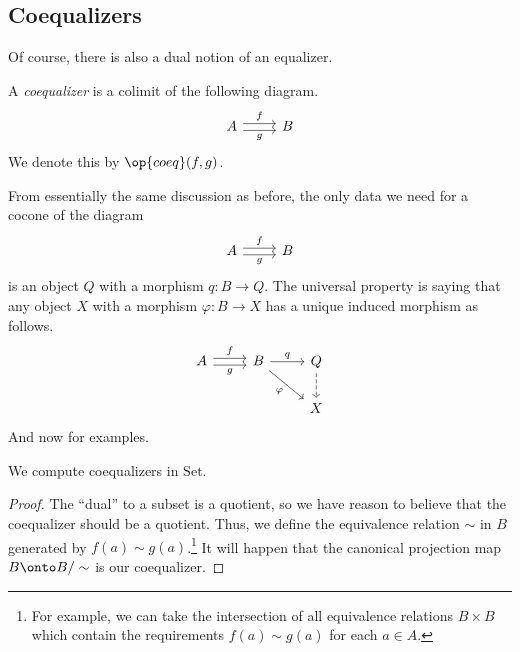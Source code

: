 \documentclass[../notes.tex]{subfiles}
\begin{document}
\subsection{Coequalizers}
Of course, there is also a dual notion of an equalizer.
\begin{defi}[Coequalizer]
	A \textit{coequalizer} is a colimit of the following diagram.
	\[\begin{tikzcd}
		A & B
		\arrow["g"', shift right=1, from=1-1, to=1-2]
		\arrow["f", shift left=1, from=1-1, to=1-2]
	\end{tikzcd}\]
	We denote this by $\op{coeq}(f,g)$.
\end{defi}
From essentially the same discussion as before, the only data we need for a cocone of the diagram
\[\begin{tikzcd}
	A & B
	\arrow["g"', shift right=1, from=1-1, to=1-2]
	\arrow["f", shift left=1, from=1-1, to=1-2]
\end{tikzcd}\]
is an object $Q$ with a morphism $q:B\to Q$. The universal property is saying that any object $X$ with a morphism $\varphi:B\to X$ has a unique induced morphism as follows.
\[\begin{tikzcd}
	A & B & Q \\
	&& X
	\arrow["g"', shift right=1, from=1-1, to=1-2]
	\arrow["f", shift left=1, from=1-1, to=1-2]
	\arrow["q", from=1-2, to=1-3]
	\arrow[dashed, from=1-3, to=2-3]
	\arrow["\varphi"', from=1-2, to=2-3]
\end{tikzcd}\]
And now for examples.
\begin{exe}
	We compute coequalizers in $\mathrm{Set}$.
\end{exe}
\begin{proof}
	The ``dual'' to a subset is a quotient, so we have reason to believe that the coequalizer should be a quotient. Thus, we define the equivalence relation $\sim$ in $B$ generated by $f(a)\sim g(a)$.\footnote{For example, we can take the intersection of all equivalence relations $B\times B$ which contain the requirements $f(a)\sim g(a)$ for each $a\in A$.} It will happen that the canonical projection map $B\onto B/\sim$ is our coequalizer.
\end{proof}
\end{document}
